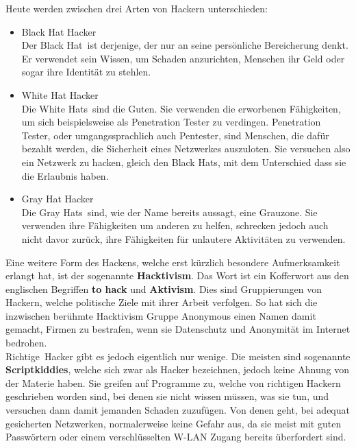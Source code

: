 \documentclass[12pt,a4paper]{report}
\begin{document}
\begin{onehalfspace}
Heute werden zwischen drei Arten von Hackern unterschieden:
\begin{itemize}
\item Black Hat Hacker\\
Der \glqq Black Hat\grqq \ ist derjenige, der nur an seine persönliche Bereicherung denkt. Er verwendet sein Wissen, um Schaden anzurichten, Menschen ihr Geld oder sogar ihre Identität zu stehlen. 
\item White Hat Hacker\\
Die \glqq White Hats\grqq \ sind die \glqq Guten\grqq . Sie verwenden die erworbenen Fähigkeiten, um sich beispielsweise als Penetration Tester zu verdingen. Penetration Tester, oder umgangssprachlich auch Pentester, sind Menschen, die dafür bezahlt werden, die Sicherheit eines Netzwerkes auszuloten. Sie versuchen also ein Netzwerk zu hacken, gleich den Black Hats, mit dem Unterschied dass sie die Erlaubnis haben.
\item Gray Hat Hacker\\
Die \glqq Gray Hats\grqq \ sind, wie der Name bereits aussagt, eine Grauzone. Sie verwenden ihre Fähigkeiten um anderen zu helfen, schrecken jedoch auch nicht davor zurück, ihre Fähigkeiten für unlautere Aktivitäten zu verwenden.
\end{itemize}

Eine weitere Form des Hackens, welche erst kürzlich besondere Aufmerksamkeit erlangt hat, ist der sogenannte \textbf{Hacktivism}. Das Wort ist ein Kofferwort aus den englischen Begriffen \textbf{to hack} und \textbf{Aktivism}. Dies sind Gruppierungen von Hackern, welche politische Ziele mit ihrer Arbeit verfolgen. So hat sich die inzwischen berühmte Hacktivism Gruppe Anonymous einen Namen damit gemacht, Firmen zu \glqq bestrafen\grqq , wenn sie Datenschutz und Anonymität im Internet bedrohen.\\

\glqq Richtige\grqq \ Hacker gibt es jedoch eigentlich nur wenige. Die meisten sind sogenannte \textbf{Scriptkiddies}, welche sich zwar als Hacker bezeichnen, jedoch keine Ahnung von der Materie haben. Sie greifen auf Programme zu, welche von richtigen Hackern geschrieben worden sind, bei denen sie nicht wissen müssen, was sie tun, und versuchen dann damit jemanden Schaden zuzufügen. Von denen geht, bei adequat gesicherten Netzwerken, normalerweise keine Gefahr aus, da sie meist mit guten Passwörtern oder einem verschlüsselten W-LAN Zugang bereits überfordert sind.


\end{onehalfspace}
\end{document}
